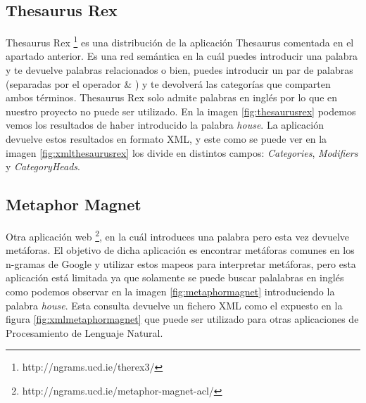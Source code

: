 \subsection{Thesaurus Rex}
\label{cap:subsec:thesaurusrex}

Thesaurus Rex  \footnote{http://ngrams.ucd.ie/therex3/} es una distribución de la aplicación Thesaurus comentada en el apartado anterior. Es una red semántica en la cuál puedes introducir una palabra y te devuelve palabras relacionados o bien, puedes introducir un par de palabras (separadas por el operador  \& ) y te devolverá las categorías que comparten ambos términos.
Thesaurus Rex solo admite palabras en inglés por lo que en nuestro proyecto no puede ser utilizado. En la imagen \ref{fig:thesaurusrex} podemos vemos los resultados de haber introducido la palabra  \textit{house}.
La aplicación devuelve estos resultados en formato XML, y este como se puede ver en la imagen \ref{fig:xmlthesaurusrex} los divide en distintos campos: \textit{Categories}, \textit{Modifiers} y \textit{CategoryHeads}.



\subsection{Metaphor Magnet}
\label{cap:subsec:metaphormagnet}
Otra aplicación web \footnote{http://ngrams.ucd.ie/metaphor-magnet-acl/}, en la cuál introduces una palabra pero esta vez devuelve metáforas. El objetivo \citep{VealeT2012} de dicha aplicación es encontrar metáforas comunes en los n-gramas de Google y utilizar estos mapeos para interpretar metáforas, pero esta aplicación está limitada ya que solamente se puede buscar palalabras en inglés como podemos observar en la imagen \ref{fig:metaphormagnet} introduciendo la palabra  \textit{house}.
Esta consulta devuelve un fichero XML como el expuesto en la figura \ref{fig:xmlmetaphormagnet} que puede ser utilizado para otras aplicaciones de Procesamiento de Lenguaje Natural.



